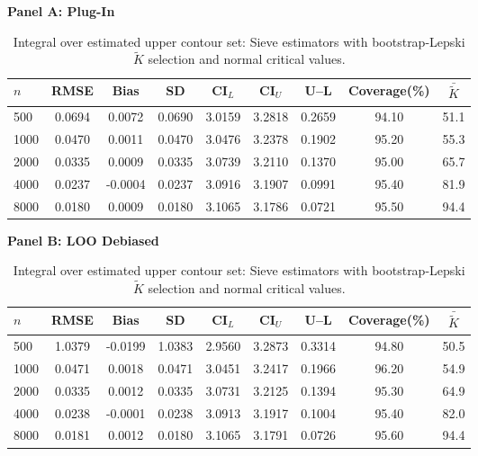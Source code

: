 \begin{table}[!h]
\centering
\small
\caption{Integral over estimated upper contour set: Sieve estimators with bootstrap-Lepski $\tilde{K}$ selection and normal critical values.}
\label{tab:Sim2_Disk}
\vspace{0.3em}
\textbf{Panel A: Plug-In}
\begin{tabular}{lcccccccc}
\hline\hline
$n$ & RMSE & Bias & SD & CI$_L$ & CI$_U$ & U--L & Coverage(\%) & $\bar{\tilde{K}}$\\
\hline
500 & 0.0694 & 0.0072 & 0.0690 & 3.0159 & 3.2818 & 0.2659 & 94.10 & 51.1\\
1000 & 0.0470 & 0.0011 & 0.0470 & 3.0476 & 3.2378 & 0.1902 & 95.20 & 55.3\\
2000 & 0.0335 & 0.0009 & 0.0335 & 3.0739 & 3.2110 & 0.1370 & 95.00 & 65.7\\
4000 & 0.0237 & -0.0004 & 0.0237 & 3.0916 & 3.1907 & 0.0991 & 95.40 & 81.9\\
8000 & 0.0180 & 0.0009 & 0.0180 & 3.1065 & 3.1786 & 0.0721 & 95.50 & 94.4\\
\hline\hline
\end{tabular}
\vspace{0.3em}
\textbf{Panel B: LOO Debiased}
\begin{tabular}{lcccccccc}
\hline\hline
$n$ & RMSE & Bias & SD & CI$_L$ & CI$_U$ & U--L & Coverage(\%) & $\bar{\tilde{K}}$\\
\hline
500 & 1.0379 & -0.0199 & 1.0383 & 2.9560 & 3.2873 & 0.3314 & 94.80 & 50.5\\
1000 & 0.0471 & 0.0018 & 0.0471 & 3.0451 & 3.2417 & 0.1966 & 96.20 & 54.9\\
2000 & 0.0335 & 0.0012 & 0.0335 & 3.0731 & 3.2125 & 0.1394 & 95.30 & 64.9\\
4000 & 0.0238 & -0.0001 & 0.0238 & 3.0913 & 3.1917 & 0.1004 & 95.40 & 82.0\\
8000 & 0.0181 & 0.0012 & 0.0180 & 3.1065 & 3.1791 & 0.0726 & 95.60 & 94.4\\
\hline\hline
\end{tabular}
\end{table}
